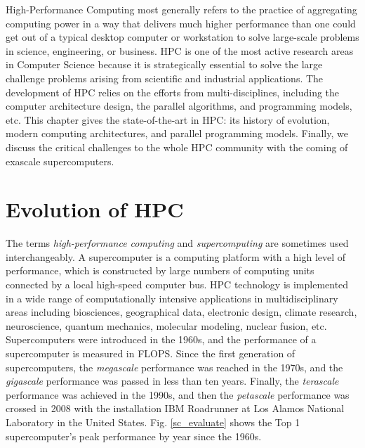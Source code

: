 \begin{displayquote}
	\textsf{High-Performance Computing most generally refers to the practice of aggregating computing power in a way that delivers much higher performance than one could get out of a typical desktop computer or workstation to solve large-scale problems in science, engineering, or business. HPC is one of the most active research areas in Computer Science because it is strategically essential to solve the large challenge problems arising from scientific and industrial applications. The development of HPC relies on the efforts from multi-disciplines, including the computer architecture design, the parallel algorithms, and programming models, etc. This chapter gives the state-of-the-art in HPC: its history of evolution, modern computing architectures, and parallel programming models. Finally, we discuss the critical challenges to the whole HPC community with the coming of exascale supercomputers.}
\end{displayquote}

\vspace{0.6in}

\section{Evolution of HPC}

The terms \textit{high-performance computing} and \textit{supercomputing} are sometimes used interchangeably. A supercomputer is a computing platform with a high level of performance, which is constructed by large numbers of computing units connected by a local high-speed computer bus. HPC technology is implemented in a wide range of computationally intensive applications in multidisciplinary areas including biosciences, geographical data, electronic design, climate research, neuroscience, quantum mechanics, molecular modeling, nuclear fusion, etc. Supercomputers were introduced in the 1960s, and the performance of a supercomputer is measured in FLOPS. Since the first generation of supercomputers, the \textit{megascale} performance was reached in the 1970s, and the \textit{gigascale} performance was passed in less than ten years. Finally, the \textit{terascale} performance was achieved in the 1990s, and then the \textit{petascale} performance was crossed in 2008 with the installation IBM Roadrunner at Los Alamos National Laboratory in the United States. Fig. \ref{sc_evaluate} shows the Top 1 supercomputer's peak performance by year since the 1960s.

